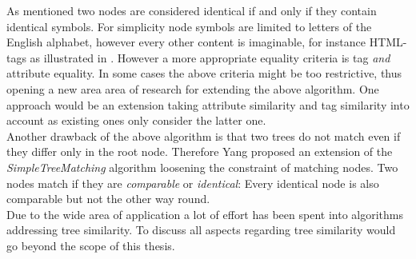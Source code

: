 \documentclass[12pt, notitlepage]{article}
\begin{document}
\vspace{\baselineskip}
As \cite{yang} mentioned two nodes are considered identical if and only if they contain identical symbols. For simplicity
node symbols are limited to letters of the English alphabet, however every other content is imaginable, for instance HTML-tags
as illustrated in \cite{simple-tree-matching}. However a more appropriate equality criteria is tag \textit{and} attribute equality. 
In some cases the above criteria might be too restrictive, thus opening a new area area of research for extending the above algorithm.
One approach would be an extension taking attribute similarity and tag similarity into account as existing
ones\cite{simple-tree-matching} only consider the latter one.\\
Another drawback of the above algorithm is that two trees do not match even if they differ only in the root node. 
Therefore Yang\cite{yang} proposed an extension of the \textit{SimpleTreeMatching} algorithm loosening the constraint of matching
nodes. Two nodes match if they are \textit{comparable} or \textit{identical}: Every identical node is also comparable but not the other way round. \\
Due to the wide area of application a lot of effort has been spent into algorithms addressing tree similarity.
To discuss all aspects regarding tree similarity would go beyond the scope of this thesis. 
\end{document}
